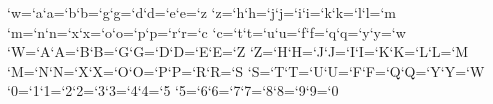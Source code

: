 \def\init{\message{@Name of the font to test = }
  \read-1 to\fontname
  \font\testfont=\fontname
  \headline={\sevenrm Test of \fontname\unskip\ on \today\ at \hours\hfil
    Page \folio}
  \testfont \setbaselineskip
  \ifdim\fontdimen6\testfont\lt10pt \rightskip=0pt plus 20pt
  \else\rightskip=0pt plus 2em \fi
  \spaceskip=\fontdimen2\testfont %
  \xspaceskip=\fontdimen2\testfont \advance\xspaceskip by\fontdimen7\testfont
  \message{Now type a test command (\string\help\space for help):}}
 
\def\mixture{\promptthree \domix\mixpattern}
\def\alternation{\promptthree \domix\altpattern}
\def\mixpattern{\0\1\0\0\1\1\0\0\0\1\1\1\0\1}
\def\altpattern{\0\1\0\1\0\1\0\1\0\1\0\1\0\1\0\1\0}
\def\domix#1{\par\chardef\0=\background \n=\starting
  \until\ifnum\n=\ending\do\chardef\1=\n #1\par\n=\count\n \repeat}
 
\count`w=`a\count`a=`b\count`b=`g\count`g=`d\count`d=`e\count`e=`z
\count`z=`h\count`h=`j\count`j=`i\count`i=`k\count`k=`l\count`l=`m
\count`m=`n\count`n=`x\count`x=`o\count`o=`p\count`p=`r\count`r=`c
\count`c=`t\count`t=`u\count`u=`f\count`f=`q\count`q=`y\count`y=`w
\count`W=`A\count`A=`B\count`B=`G\count`G=`D\count`D=`E\count`E=`Z
\count`Z=`H\count`H=`J\count`J=`I\count`I=`K\count`K=`L\count`L=`M
\count`M=`N\count`N=`X\count`X=`O\count`O=`P\count`P=`R\count`R=`S
\count`S=`T\count`T=`U\count`U=`F\count`F=`Q\count`Q=`Y\count`Y=`W
\count`0=`1\count`1=`2\count`2=`3\count`3=`4\count`4=`5
\count`5=`6\count`6=`7\count`7=`8\count`8=`9\count`9=`0
 
\long{}
\def\etareti{\cond\let\next=\relax\else\let\next=\etareti\fi\body\next}
 
\def\alphabet{\setchar\background \dosseries{`a}{`w}}
\def\ALPHABET{\setchar\background \doseries{`A}{`W}}
\def\series{\promptthree \doseries\starting\ending}
\def\doseries#1#2{\def\!{\discretionary{\background}{\background}{\background}}
  \!\n=#1\until\ifnum\n=#2\do\char\n\!\n=\count\n \repeat\par}
\def\dosseries#1#2{\def\!{\discretionary{\background}{\background}{\background}}
  \!\n=#1\until\ifnum\n=#2\do\char\n\!\n=\count\n \repeat s\par}
 
\def\lowers{\docomprehensive hs{`a}{`w}}
\def\uppers{\docomprehensive HO{`A}{`W}}
\def\digits{\docomprehensive H0{`0}{`9}}
\def\docomprehensive#1#2#3#4{\par\n=#3
  \until\ifnum\n=#4\do\line{\altr#1\hfil\altr#2}\n=\count\n\repeat}
\def\altr#1{\setbox0=\hbox{#1}\setbox2=\hbox{#1\char\n}%
  \dim=.5\hsize \advance\dim-\wd0 \divide\dim\wd2 \multiply\dim\wd2
  \xleaders\box2\hskip\dim\box0}
\def\alphabets{\m=`a\until\ifnum\m=`w
  \do\chardef\background=\m{\dosseries{`a}{`w}}\m=\count\m \repeat}
\def\ALPHABETS{\m=`A\until\ifnum\m=`W
  \do\chardef\background=\m{\doseries{`A}{`W}}\m=\count\m \repeat}
 
